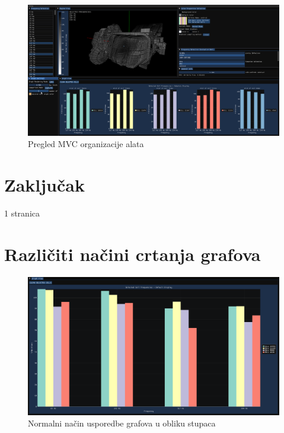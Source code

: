 \documentclass[times, utf8, diplomski]{fer}
\begin{document}
\begin{figure} [H]
	\centering
    \includegraphics[width=\textwidth]{demonstration/selected_cell_subplots.png}
    \caption{Pregled MVC organizacije alata}
    \label{fig:high-level-overview}
\end{figure}

\chapter{Zaključak}
1 stranica




\appendix
\chapter{Različiti načini crtanja grafova} \label{appendix:graph-display-examples}

\begin{figure}[H]
	\centering
	\includegraphics[width=\textwidth]{default_graph_display_bars.png}
	\caption{Normalni način usporedbe grafova u obliku stupaca}
    \label{appendix:default_graph_display_bars}
\end{figure}
\end{document}
